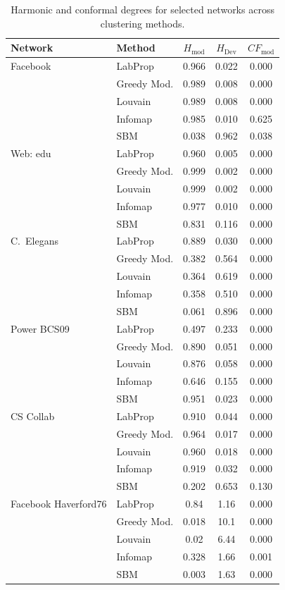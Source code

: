 \documentclass[twocolumn,superscriptaddress,tightenlines,aps,prx,floatfix]{revtex4-2}
\begin{document}
\begin{bibunit}
\begin{table}[h]
\centering
\caption{Harmonic and conformal degrees for selected networks across clustering methods.}
\label{tab:example_networks}
\begin{tabular}{llccc}
\toprule
Network & Method & $H_{\text{mod}}$ & $H_{\text{Dev}}$ & $CF_{\text{mod}}$ \\
\midrule
Facebook & LabProp & 0.966 & 0.022 & 0.000 \\
& Greedy Mod. & 0.989 & 0.008 & 0.000 \\
& Louvain & 0.989 & 0.008 & 0.000 \\
& Infomap & 0.985 & 0.010 & 0.625 \\
& SBM & 0.038 & 0.962 & 0.038 \\
\midrule
Web: edu & LabProp & 0.960 & 0.005 & 0.000 \\
& Greedy Mod. & 0.999 & 0.002 & 0.000 \\
& Louvain & 0.999 & 0.002 & 0.000 \\
& Infomap & 0.977 & 0.010 & 0.000 \\
& SBM & 0.831 & 0.116 & 0.000 \\
\midrule
C.~Elegans & LabProp & 0.889 & 0.030 & 0.000 \\
& Greedy Mod. & 0.382 & 0.564 & 0.000 \\
& Louvain & 0.364 & 0.619 & 0.000 \\
& Infomap & 0.358 & 0.510 & 0.000 \\
& SBM & 0.061 & 0.896 & 0.000 \\
\midrule
Power BCS09 & LabProp & 0.497 & 0.233 & 0.000 \\
& Greedy Mod. & 0.890 & 0.051 & 0.000 \\
& Louvain & 0.876 & 0.058 & 0.000 \\
& Infomap & 0.646 & 0.155 & 0.000 \\
& SBM & 0.951 & 0.023 & 0.000 \\
\midrule
CS Collab & LabProp & 0.910 & 0.044 & 0.000 \\
& Greedy Mod. & 0.964 & 0.017 & 0.000 \\
& Louvain & 0.960 & 0.018 & 0.000 \\
& Infomap & 0.919 & 0.032 & 0.000 \\
& SBM & 0.202 & 0.653 & 0.130 \\
\midrule
Facebook Haverford76 & LabProp & 0.84 & 1.16 & 0.000 \\
& Greedy Mod. & 0.018 & 10.1 & 0.000 \\
& Louvain & 0.02 & 6.44 & 0.000 \\
& Infomap & 0.328 & 1.66 & 0.001 \\
& SBM & 0.003 &1.63 & 0.000 \\
\bottomrule
\end{tabular}
\end{table}


\end{bibunit}
\end{document}
